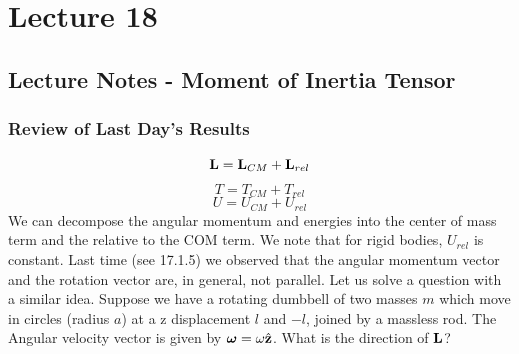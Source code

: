 \documentclass[../PHYS306Notes.tex]{subfiles}
\begin{document}
\section{Lecture 18}
\subsection{Lecture Notes - Moment of Inertia Tensor}
\subsubsection{Review of Last Day's Results}
\[\mathbf{L} = \mathbf{L}_{CM} + \mathbf{L}_{rel}\]
\[T = T_{CM} + T_{rel}\]
\[U = U_{CM} + U_{rel}\]
We can decompose the angular momentum and energies into the center of mass term and the relative to the COM term. We note that for rigid bodies, $U_{rel}$ is constant. 
\newline Last time (see 17.1.5) we observed that the angular momentum vector and the rotation vector are, in general, not parallel. Let us solve a question with a similar idea. Suppose we have a rotating dumbbell of two masses $m$ which move in circles (radius $a$) at a z displacement $l$ and $-l$, joined by a massless rod. The Angular velocity vector is given by $\bm{\omega} = \omega\hat{\mathbf{z}}$. What is the direction of $\mathbf{L}$?
\end{document}
